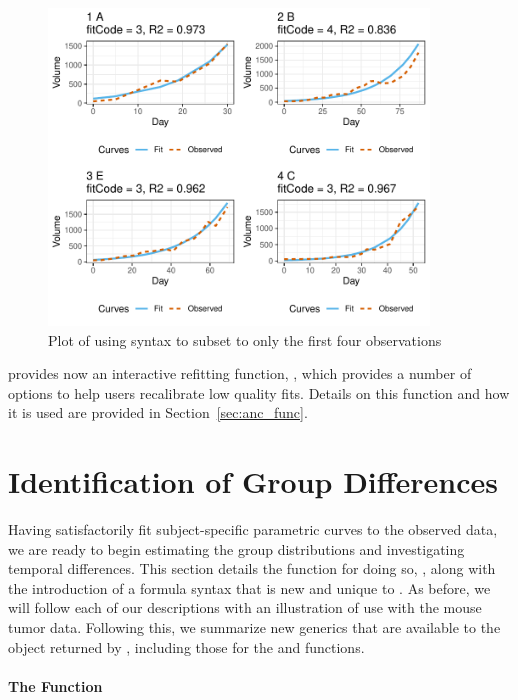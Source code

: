 \begin{figure}[H]
\centering
\includegraphics[width=0.9\textwidth]{img/mouse_fit.pdf}
\caption{Plot of  using   syntax to subset to only the first four observations}
\label{fig:plot_fits}
\end{figure}

 provides now an interactive refitting function, , which provides a number of options to help users recalibrate low quality fits. Details on this function and how it is used are provided in Section~\ref{sec:anc_func}.


\section{Identification of Group Differences}

Having satisfactorily fit subject-specific parametric curves to the observed data, we are ready to begin estimating the group distributions and investigating temporal differences. This section details the function for doing so, , along with the introduction of a formula syntax that is new and unique to . As before, we will follow each of our descriptions with an illustration of use with the mouse tumor data. Following this, we summarize new generics that are available to the object returned by , including those for the  and  functions.


\paragraph{The  Function}

